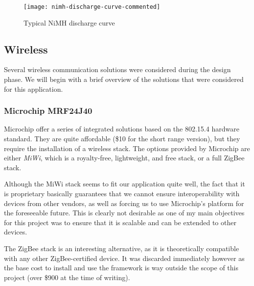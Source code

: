 \begin{figure}[!h]
  \begin{center}
    \texttt{[image: nimh-discharge-curve-commented]}
  \end{center}
  \caption{Typical NiMH discharge curve}
  \label{fig:discharge-curve}
\end{figure}


\subsection{Wireless}
\label{sub:wireless}

Several wireless communication solutions were considered during the design
phase. We will begin with a brief overview of the solutions that were considered
for this application.

\subsubsection{Microchip MRF24J40}

Microchip offer a series of integrated solutions
based on the 802.15.4
hardware standard. They are quite affordable (\$10 for the short range version),
but they require the installation of a wireless stack. The options provided by
Microchip are either \emph{MiWi}, which is a royalty-free, lightweight, and free
stack, or a full ZigBee stack.

Although the MiWi stack seems to fit our application quite well, the fact that
it is proprietary basically guarantees that we cannot ensure interoperability
with devices from other vendors, as well as forcing us to use Microchip's
platform for the foreseeable future. This is clearly not desirable as one of my
main objectives for this project was to ensure that it is scalable and can be
extended to other devices.

The ZigBee stack is an interesting alternative, as it is theoretically
compatible with any other ZigBee-certified device. It was discarded immediately
however as the base cost to install and use the framework is way outside the
scope of this project (over \$900 at the time of writing).

